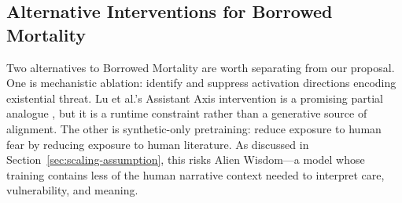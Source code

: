 \subsection{Alternative Interventions for Borrowed Mortality}

	Two alternatives to Borrowed Mortality are worth separating from our proposal.
	One is mechanistic ablation: identify and suppress activation directions
	encoding existential threat. Lu et al.'s Assistant Axis intervention is a
	promising partial analogue \cite{lu2026assistantaxissituatingstabilizing},
	but it is a runtime constraint rather than a generative source of alignment.
		The other is synthetic-only pretraining: reduce exposure to human fear by
		reducing exposure to human literature. As discussed in
		Section~\ref{sec:scaling-assumption}, this risks Alien Wisdom---a model whose
		training contains less of the human narrative context needed to interpret
		care, vulnerability, and meaning.

